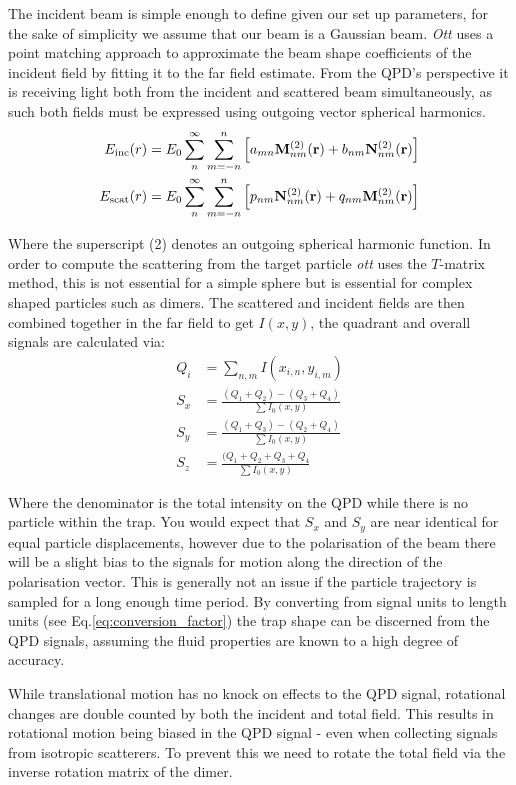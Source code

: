 The incident beam is simple enough to define given our set up 
parameters, for the sake of simplicity we assume that our beam is a 
Gaussian beam. \textit{Ott} uses a point matching approach to 
approximate the beam shape coefficients of the incident field by 
fitting it to the far field estimate. From the QPD's perspective 
it is receiving light both from the incident and scattered beam simultaneously, as such both fields must be expressed using outgoing 
vector spherical harmonics.
\begin{align}
	E_{\rm inc}(r)&=
	E_0\sum^\infty_{n}\sum^n_{m=-n}\left[a_{mn}{\bf M}^{(2)}_{nm}({\bf r})+
	b_{nm}{\bf N}^{(2)}_{nm}({\bf r}) \right] 
	\\
	E_{\rm scat}(r)&=E_0 \sum^\infty_n \sum^n_{m=-n} \left[
	p_{nm}{\bf N}_{nm}^{(2)}({\bf r})+q_{nm}{\bf M}_{nm}^{(2)}({\bf r})
	\right] 
\end{align}

Where the superscript (2) denotes an outgoing spherical harmonic
function. In order to compute the scattering from the target particle \textit{ott} uses the $T$-matrix method, this is not essential 
for a simple sphere but is essential for complex shaped particles 
such as dimers. The scattered and incident fields are then combined 
together in the far field to get $I(x,y)$, the quadrant and overall 
signals are calculated via:
\begin{align}
	Q_i &= \sum_{n,m} I(x_{i,n}, y_{i,m}) \\
	S_{x} &= \frac{(Q_1+Q_2)-(Q_3+Q_4)}{\sum I_0(x,y)} \\
	S_{y} &= \frac{(Q_1+Q_3)-(Q_2+Q_4)}{\sum I_0(x,y)} \\
	S_{z} &= \frac{(Q_1+Q_2+Q_3+Q_4}{\sum I_0(x,y)}
\end{align}

Where the denominator is the total intensity on the QPD while there is 
no particle within the trap. You would expect that $S_x$ and $S_y$ are
near identical for equal particle displacements, however due to the 
polarisation of the beam there will be a slight bias to the signals 
for motion along the direction of the polarisation vector. This is 
generally not an issue if the particle trajectory is sampled for a 
long enough time period. By converting from signal units to length
units (see Eq.\eqref{eq:conversion_factor}) the trap shape can be 
discerned from the QPD signals, assuming the fluid properties are
known to a high degree of accuracy.

While translational motion has no knock on effects to the QPD signal, 
rotational changes are double counted by both the incident and total 
field. This results in rotational motion being biased in the QPD signal 
- even when collecting signals from isotropic scatterers. To prevent 
this we need to rotate the total field via the inverse rotation matrix
of the dimer.

